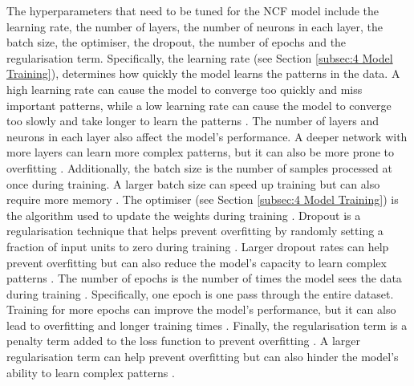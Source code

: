 The hyperparameters that need to be tuned for the NCF model include the learning rate, the number of layers, the number of neurons in each layer, the batch size, the optimiser, the dropout, the number of epochs and the regularisation term. Specifically, the learning rate (see Section \ref{subsec:4 Model Training}), determines how quickly the model learns the patterns in the data. A high learning rate can cause the model to converge too quickly and miss important patterns, while a low learning rate can cause the model to converge too slowly and take longer to learn the patterns \cite{leung2003tuning}. The number of layers and neurons in each layer also affect the model's performance. A deeper network with more layers can learn more complex patterns, but it can also be more prone to overfitting \cite{diaz2017effective}. Additionally, the batch size is the number of samples processed at once during training. A larger batch size can speed up training but can also require more memory \cite{gurney2018introduction}. The optimiser (see Section \ref{subsec:4 Model Training}) is the algorithm used to update the weights during training \cite{gurney2018introduction}. Dropout is a regularisation technique that helps prevent overfitting by randomly setting a fraction of input units to zero during training \cite{srivastava2014dropout}. Larger dropout rates can help prevent overfitting but can also reduce the model's capacity to learn complex patterns \cite{srivastava2014dropout}. The number of epochs is the number of times the model sees the data during training \cite{gurney2018introduction}. Specifically, one epoch is one pass through the entire dataset. Training for more epochs can improve the model's performance, but it can also lead to overfitting and longer training times \cite{diaz2017effective}. Finally, the regularisation term is a penalty term added to the loss function to prevent overfitting \cite{gurney2018introduction}. A larger regularisation term can help prevent overfitting but can also hinder the model's ability to learn complex patterns \cite{gurney2018introduction}.

